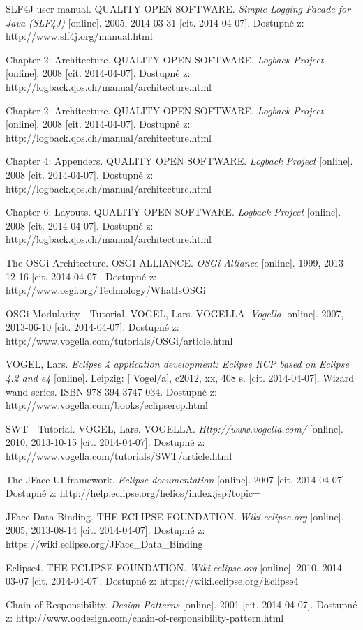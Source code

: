 \documentclass[ing,male,java,dept460]{diploma}		%
\begin{document}
\begin{thebibliography}{99}

 SLF4J user manual. QUALITY OPEN SOFTWARE. \textit{Simple Logging Facade for Java (SLF4J)} [online]. 2005, 2014-03-31 [cit. 2014-04-07]. Dostupné z: http://www.slf4j.org/manual.html

 Chapter 2: Architecture. QUALITY OPEN SOFTWARE. \textit{Logback Project} [online]. 2008 [cit. 2014-04-07]. Dostupné z: http://logback.qos.ch/manual/architecture.html

 Chapter 2: Architecture. QUALITY OPEN SOFTWARE. \textit{Logback Project} [online]. 2008 [cit. 2014-04-07]. Dostupné z: http://logback.qos.ch/manual/architecture.html

 Chapter 4: Appenders. QUALITY OPEN SOFTWARE. \textit{Logback Project} [online]. 2008 [cit. 2014-04-07]. Dostupné z: http://logback.qos.ch/manual/architecture.html

 Chapter 6: Layouts. QUALITY OPEN SOFTWARE. \textit{Logback Project} [online]. 2008 [cit. 2014-04-07]. Dostupné z: http://logback.qos.ch/manual/architecture.html

 The OSGi Architecture. OSGI ALLIANCE. \textit{OSGi Alliance} [online]. 1999, 2013-12-16 [cit. 2014-04-07]. Dostupné z: http://www.osgi.org/Technology/WhatIsOSGi

 OSGi Modularity - Tutorial. VOGEL, Lars. VOGELLA. \textit{Vogella} [online]. 2007, 2013-06-10 [cit. 2014-04-07]. Dostupné z: http://www.vogella.com/tutorials/OSGi/article.html

 VOGEL, Lars. \textit{Eclipse 4 application development: Eclipse RCP based on Eclipse 4.2 and e4} [online]. Leipzig: [ Vogel/a], c2012, xx, 408 s. [cit. 2014-04-07]. Wizard wand series. ISBN 978-394-3747-034. Dostupné z: http://www.vogella.com/books/eclipsercp.html

 SWT - Tutorial. VOGEL, Lars. VOGELLA. \textit{Http://www.vogella.com/} [online]. 2010, 2013-10-15 [cit. 2014-04-07]. Dostupné z: http://www.vogella.com/tutorials/SWT/article.html

 The JFace UI framework. \textit{Eclipse documentation} [online]. 2007 [cit. 2014-04-07]. Dostupné z: http://help.eclipse.org/helios/index.jsp?topic=%

 JFace Data Binding. THE ECLIPSE FOUNDATION. \textit{Wiki.eclipse.org} [online]. 2005, 2013-08-14 [cit. 2014-04-07]. Dostupné z: https://wiki.eclipse.org/JFace\_Data\_Binding

 Eclipse4. THE ECLIPSE FOUNDATION. \textit{Wiki.eclipse.org} [online]. 2010, 2014-03-07 [cit. 2014-04-07]. Dostupné z: https://wiki.eclipse.org/Eclipse4

 Chain of Responsibility. \textit{Design Patterns} [online]. 2001 [cit. 2014-04-07]. Dostupné z: http://www.oodesign.com/chain-of-responsibility-pattern.html


\end{thebibliography}
\end{document}
